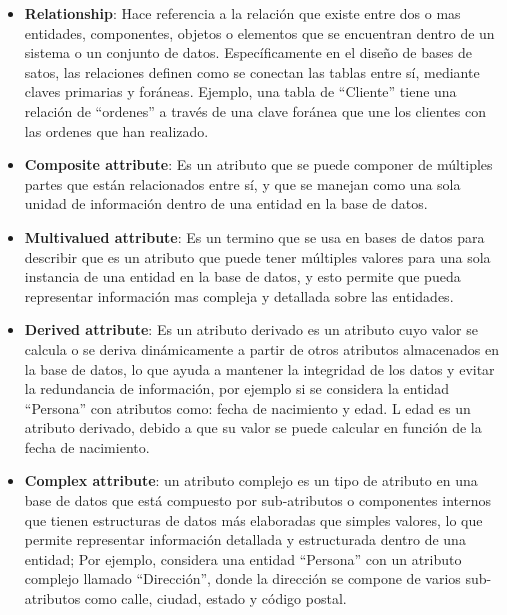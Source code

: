 \documentclass[letterpaper, 12pt]{report}
\begin{document}
\begin{itemize}[label=$\triangleright$]
	      \nocite{UNIVERSIDAD_DON_BOSCO}

	\item \textbf{Relationship}: Hace referencia a la relación
	      que existe entre dos o mas entidades, componentes, objetos o
	      elementos que se encuentran dentro de un sistema o un conjunto
	      de datos. Específicamente en el diseño de bases de satos, las
	      relaciones definen como se conectan las tablas entre sí,
	      mediante claves primarias y foráneas. Ejemplo, una tabla
	      de “Cliente” tiene una relación de “ordenes” a través de
	      una clave foránea que une los clientes con las ordenes que han realizado.

	\item \textbf{Composite attribute}: Es un atributo que se puede
	      componer de múltiples partes que están relacionados entre sí, y
	      que se manejan como una sola unidad de información dentro de una
	      entidad en la base de datos.

	\item \textbf{Multivalued attribute}: Es un termino que se usa
	      en bases de datos para describir que es un atributo que puede
	      tener múltiples valores para una sola instancia de una entidad
	      en la base de datos, y esto permite que pueda representar
	      información mas compleja y detallada sobre las entidades.

	\item \textbf{Derived attribute}: Es un atributo derivado es un
	      atributo cuyo valor se calcula o se deriva dinámicamente a partir de otros
	      atributos almacenados en la base de datos, lo que ayuda a mantener la
	      integridad de los datos y evitar la redundancia de información, por
	      ejemplo si se considera la entidad “Persona” con atributos como: fecha
	      de nacimiento y edad. L edad es un atributo derivado, debido a que su
	      valor se puede calcular en función de la fecha de nacimiento.

	\item \textbf{Complex attribute}: un atributo complejo es un tipo de
	      atributo en una base de datos que está compuesto por sub-atributos o
	      componentes internos que tienen estructuras de datos más elaboradas
	      que simples valores, lo que permite representar información detallada
	      y estructurada dentro de una entidad; Por ejemplo, considera una
	      entidad ``Persona'' con un atributo complejo llamado ``Dirección'',
	      donde la dirección se compone de varios sub-atributos como calle,
	      ciudad, estado y código postal.


\end{itemize}
\end{document}
